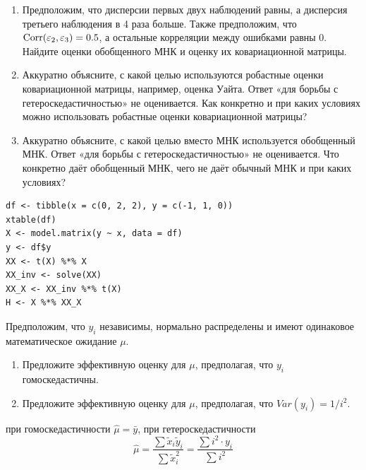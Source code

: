 \begin{problem}
\begin{enumerate}
\item  Предположим, что дисперсии первых двух наблюдений равны, а дисперсия третьего наблюдения в 4 раза больше. Также предположим, что $\operatorname{Corr}(\varepsilon_2, \varepsilon_3)=0.5$, а остальные корреляции между ошибками равны 0. Найдите оценки обобщенного МНК и оценку их ковариационной матрицы.

\item Аккуратно объясните, с какой целью используются робастные оценки ковариационной матрицы, например, оценка Уайта. Ответ «для борьбы с гетероскедастичностью» не оценивается. Как конкретно и при каких условиях можно использовать робастные оценки ковариационной матрицы?

\item Аккуратно объясните, с какой целью вместо МНК используется обобщенный МНК. Ответ «для борьбы с гетероскедастичностью» не оценивается. Что конкретно даёт обобщенный МНК, чего не даёт обычный МНК и при каких условиях?
\end{enumerate}



\begin{sol}
\begin{verbatim}
df <- tibble(x = c(0, 2, 2), y = c(-1, 1, 0))
xtable(df)
X <- model.matrix(y ~ x, data = df)
y <- df$y
XX <- t(X) %*% X
XX_inv <- solve(XX)
XX_X <- XX_inv %*% t(X)
H <- X %*% XX_X
\end{verbatim}
\end{sol}
\end{problem}



\begin{problem}
Предположим, что $y_i$ независимы, нормально распределены и имеют одинаковое математическое ожидание $\mu$.

\begin{enumerate}
\item  Предложите эффективную оценку для $\mu$, предполагая, что $y_i$ гомоскедастичны.
\item  Предложите эффективную оценку для $\mu$, предполагая, что $Var(y_i)=1/i^2$.
\end{enumerate}


\begin{sol}
при гомоскедастичности $\hat{\mu}=\bar{y}$, при гетероскедастичности
\[
\hat{\mu}=\frac{\sum \tilde{x}_i \tilde{y}_i}{\sum \tilde{x}_i^2}=\frac{\sum i^2\cdot y_i}{\sum i^2}
\]
\end{sol}
\end{problem}


